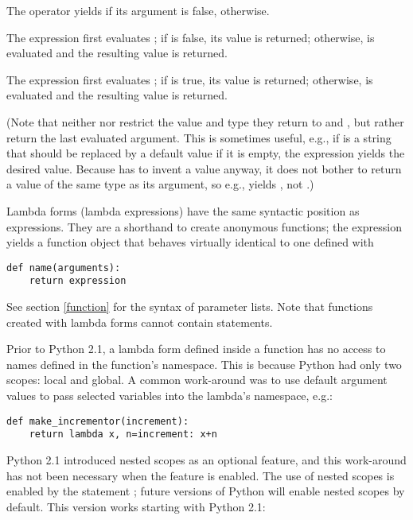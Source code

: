 The operator  yields  if its argument is false,
 otherwise.

The expression  first evaluates ; if
 is false, its value is returned; otherwise,  is
evaluated and the resulting value is returned.

The expression  first evaluates ; if
 is true, its value is returned; otherwise,  is
evaluated and the resulting value is returned.

(Note that neither  nor  restrict the value
and type they return to  and , but rather return the
last evaluated argument.
This is sometimes useful, e.g., if  is a string that should be
replaced by a default value if it is empty, the expression
 yields the desired value.  Because  has to
invent a value anyway, it does not bother to return a value of the
same type as its argument, so e.g.,  yields ,
not .)

Lambda forms (lambda expressions) have the same syntactic position as
expressions.  They are a shorthand to create anonymous functions; the
expression 
yields a function object that behaves virtually identical to one
defined with

\begin{verbatim}
def name(arguments):
    return expression
\end{verbatim}

See section \ref{function} for the syntax of parameter lists.  Note
that functions created with lambda forms cannot contain statements.
\label{lambda}

 Prior to Python 2.1, a lambda form defined
inside a function has no access to names defined in the function's
namespace.  This is because Python had only two scopes: local and
global.  A common work-around was to use default argument values to
pass selected variables into the lambda's namespace, e.g.:

\begin{verbatim}
def make_incrementor(increment):
    return lambda x, n=increment: x+n
\end{verbatim}

Python 2.1 introduced nested scopes as an optional feature, and this
work-around has not been necessary when the feature is enabled.  The
use of nested scopes is enabled by the statement ; future versions of Python will enable nested
scopes by default.  This version works starting with Python 2.1:

